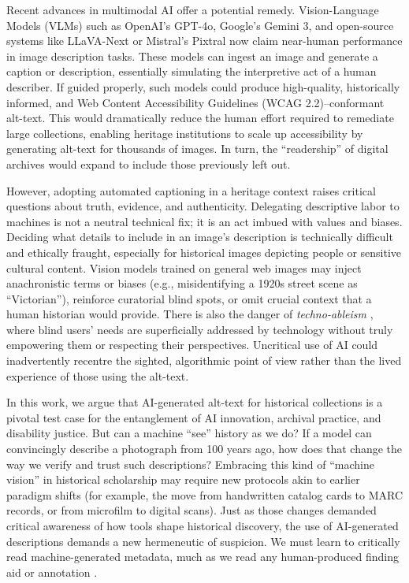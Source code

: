 \documentclass{anthology-ch}         %
\begin{document}
Recent advances in multimodal AI offer a potential remedy. Vision-Language Models (VLMs) such as OpenAI’s GPT-4o, Google’s Gemini 3, and open-source systems like LLaVA-Next or Mistral’s Pixtral now claim near-human performance in image description tasks. These models can ingest an image and generate a caption or description, essentially simulating the interpretive act of a human describer. If guided properly, such models could produce high-quality, historically informed, and Web Content Accessibility Guidelines (WCAG 2.2)–conformant alt-text. This would dramatically reduce the human effort required to remediate large collections, enabling heritage institutions to scale up accessibility by generating alt-text for thousands of images. In turn, the ``readership'' of digital archives would expand to include those previously left out.

However, adopting automated captioning in a heritage context raises critical questions about truth, evidence, and authenticity. Delegating descriptive labor to machines is not a neutral technical fix; it is an act imbued with values and biases. Deciding what details to include in an image’s description is technically difficult and ethically fraught, especially for historical images depicting people or sensitive cultural content. Vision models trained on general web images may inject anachronistic terms or biases (e.g., misidentifying a 1920s street scene as ``Victorian''), reinforce curatorial blind spots, or omit crucial context that a human historian would provide. There is also the danger of \emph{techno-ableism} \autocite{shew2023}, where blind users’ needs are superficially addressed by technology without truly empowering them or respecting their perspectives. Uncritical use of AI could inadvertently recentre the sighted, algorithmic point of view rather than the lived experience of those using the alt-text.

In this work, we argue that AI-generated alt-text for historical collections is a pivotal test case for the entanglement of AI innovation, archival practice, and disability justice. But can a machine ``see'' history as we do? If a model can convincingly describe a photograph from 100 years ago, how does that change the way we verify and trust such descriptions? Embracing this kind of ``machine vision'' in historical scholarship may require new protocols akin to earlier paradigm shifts (for example, the move from handwritten catalog cards to MARC records, or from microfilm to digital scans). Just as those changes demanded critical awareness of how tools shape historical discovery, the use of AI-generated descriptions demands a new hermeneutic of suspicion. We must learn to critically read machine-generated metadata, much as we read any human-produced finding aid or annotation \autocite{fickers2022}.
\end{document}
